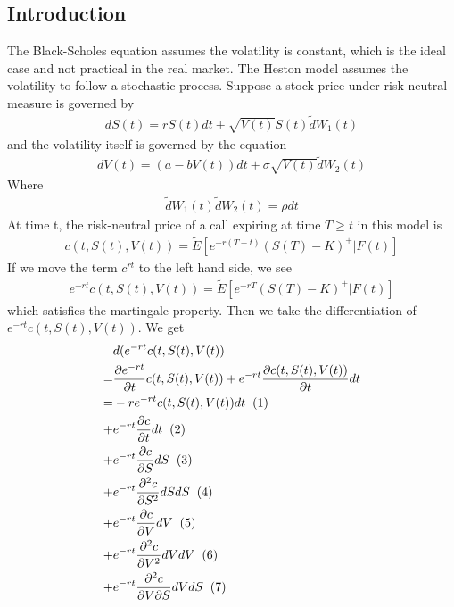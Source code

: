 \documentclass[a4paper]{article}
\begin{document}
\subsection{Introduction}
The Black-Scholes equation assumes the volatility is constant, which is the ideal case and not practical in the real market. The Heston model assumes the volatility to follow a stochastic process. Suppose a stock price under risk-neutral measure is governed by
\begin{align*}
	dS(t) = rS(t)dt + \sqrt{V(t)} S(t) \tilde dW_1(t)
\end{align*}
and the volatility itself is governed by the equation
\begin{align*}
	dV(t) = (a -bV(t))dt + \sigma \sqrt{V(t)} \tilde dW_2(t)
\end{align*}
Where 
\begin{align*}
	\tilde dW_1(t) \tilde dW_2(t) = \rho dt
\end{align*}
At time t, the risk-neutral price of a call expiring at time $T \geq t$ in this model is
\begin{align*}
	c(t, S(t), V(t)) = \tilde E[e^{-r(T-t)}(S(T)-K)^+|F(t)]
\end{align*}
If we move the term $c^{rt}$ to the left hand side, we see
\begin{align*}
	e^{-rt}c(t, S(t), V(t)) = \tilde E[e^{-rT}(S(T)-K)^+|F(t)]
\end{align*}
which satisfies the martingale property.
Then we take the differentiation of $e^{-rt}c(t, S(t), V(t))$. We get
\begin{align*}
	& d(e^{-rt}c(t, S(t), V(t))\\
	= & \frac{\partial e^{-rt}}{\partial t} c(t, S(t), V(t)) 
	+ e^{-rt}\frac{\partial c(t, S(t), V(t))}{\partial t} dt \\
	= & -re^{-rt}c(t, S(t),V(t))dt \hspace{2mm} (1)\\
	+ & e^{-rt} \frac{\partial c}{\partial t} dt \hspace{2mm} (2) \\
	+ & e^{-rt} \frac{\partial c}{\partial S} dS \hspace{2mm} (3) \\
	+ & e^{-rt} \frac{\partial^2 c}{\partial S^2} dS dS \hspace{2mm} (4)\\
	+ & e^{-rt} \frac{\partial c}{\partial V} dV \hspace{2mm} (5) \\
	+ & e^{-rt} \frac{\partial^2 c}{\partial V^2} dV dV\hspace{2mm} (6)\\
	+ & e^{-rt} \frac{\partial^2 c}{\partial V \partial S} dV dS\hspace{2mm} (7)
\end{align*}
\end{document}
